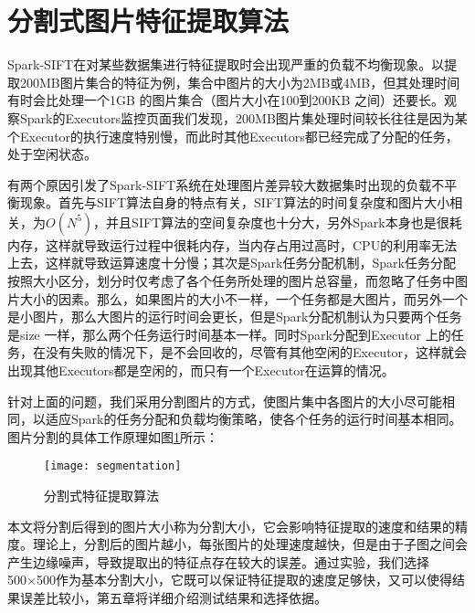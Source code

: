 \section{分割式图片特征提取算法}
Spark-SIFT在对某些数据集进行特征提取时会出现严重的负载不均衡现象。以提取200MB图片集合的特征为例，集合中图片的大小为2MB或4MB，但其处理时间有时会比处理一个1GB 的图片集合（图片大小在100到200KB 之间）还要长。观察Spark的Executors监控页面我们发现，200MB图片集处理时间较长往往是因为某个Executor的执行速度特别慢，而此时其他Executors都已经完成了分配的任务，处于空闲状态。

有两个原因引发了Spark-SIFT系统在处理图片差异较大数据集时出现的负载不平衡现象。首先与SIFT算法自身的特点有关，SIFT算法的时间复杂度和图片大小相关，为$O(N^5)$，并且SIFT算法的空间复杂度也十分大，另外Spark本身也是很耗内存，这样就导致运行过程中很耗内存，当内存占用过高时，CPU的利用率无法上去，这样就导致运算速度十分慢；其次是Spark任务分配机制，Spark任务分配按照大小区分，划分时仅考虑了各个任务所处理的图片总容量，而忽略了任务中图片大小的因素。那么，如果图片的大小不一样，一个任务都是大图片，而另外一个是小图片，那么大图片的运行时间会更长，但是Spark分配机制认为只要两个任务是size 一样，那么两个任务运行时间基本一样。同时Spark分配到Executor 上的任务，在没有失败的情况下，是不会回收的，尽管有其他空闲的Executor，这样就会出现其他Executors都是空闲的，而只有一个Executor在运算的情况。

针对上面的问题，我们采用分割图片的方式，使图片集中各图片的大小尽可能相同，以适应Spark的任务分配和负载均衡策略，使各个任务的运行时间基本相同。图片分割的具体工作原理如图\ref{fig:segmentation}所示：
\begin{figure}[htp]
\centering
\texttt{[image: segmentation]}
\caption{分割式特征提取算法}
\label{fig:segmentation}
\end{figure}

本文将分割后得到的图片大小称为分割大小，它会影响特征提取的速度和结果的精度。理论上，分割后的图片越小，每张图片的处理速度越快，但是由于子图之间会产生边缘噪声，导致提取出的特征点存在较大的误差。通过实验，我们选择500×500作为基本分割大小，它既可以保证特征提取的速度足够快，又可以使得结果误差比较小，第五章将详细介绍测试结果和选择依据。

